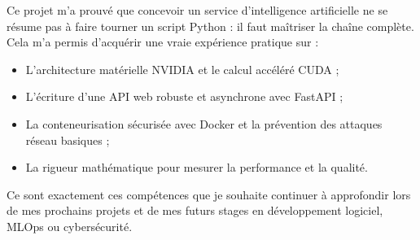 \documentclass[11pt,a4paper]{article}
\begin{document}
Ce projet m'a prouvé que concevoir un service d'intelligence artificielle ne se résume pas à faire tourner un script Python : il faut maîtriser la chaîne complète. Cela m'a permis d'acquérir une vraie expérience pratique sur :
\begin{itemize}[noitemsep]
    \item L'architecture matérielle NVIDIA et le calcul accéléré CUDA ;
    \item L'écriture d'une API web robuste et asynchrone avec FastAPI ;
    \item La conteneurisation sécurisée avec Docker et la prévention des attaques réseau basiques ;
    \item La rigueur mathématique pour mesurer la performance et la qualité.
\end{itemize}

Ce sont exactement ces compétences que je souhaite continuer à approfondir lors de mes prochains projets et de mes futurs stages en développement logiciel, MLOps ou cybersécurité.
\end{document}
